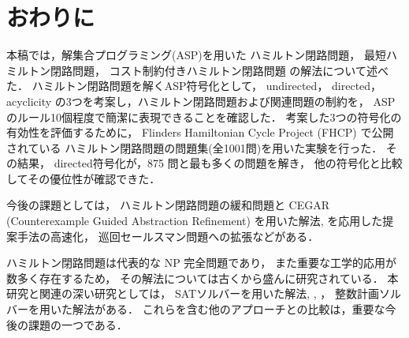 ﻿%
\section{おわりに}\label{chap:conclusion}

本稿では，解集合プログラミング(ASP)を用いた
ハミルトン閉路問題，
最短ハミルトン閉路問題，
コスト制約付きハミルトン閉路問題
の解法について述べた．
%
ハミルトン閉路問題を解くASP符号化として，
\textsf{undirected}，
\textsf{directed}，
\textsf{acyclicity}
の3つを考案し，ハミルトン閉路問題および関連問題の制約を，
ASPのルール10個程度で簡潔に表現できることを確認した．
%
考案した3つの符号化の有効性を評価するために，
Flinders Hamiltonian Cycle Project (FHCP) で公開されている
ハミルトン閉路問題の問題集(全1001問)を用いた実験を行った．
その結果，
\textsf{directed}符号化が，875 問と最も多くの問題を解き，
他の符号化と比較してその優位性が確認できた．

今後の課題としては，
ハミルトン閉路問題の緩和問題と
CEGAR (Counterexample Guided Abstraction Refinement)
を用いた解法\cite{soh14:jelia2014}, \cite{soh20:cegar}を応用した提案手法の高速化，
巡回セールスマン問題への拡張などがある．

ハミルトン閉路問題は代表的な NP 完全問題であり，
また重要な工学的応用が数多く存在するため，
その解法については古くから盛んに研究されている．
本研究と関連の深い研究としては，
SATソルバーを用いた解法\cite{Prestwich03:DAM}, \cite{VelevG09:relative}, \cite{soh14:jelia2014}，
整数計画ソルバーを用いた解法\cite{numata11:tsp}がある．
これらを含む他のアプローチとの比較は，重要な今後の課題の一つである．


